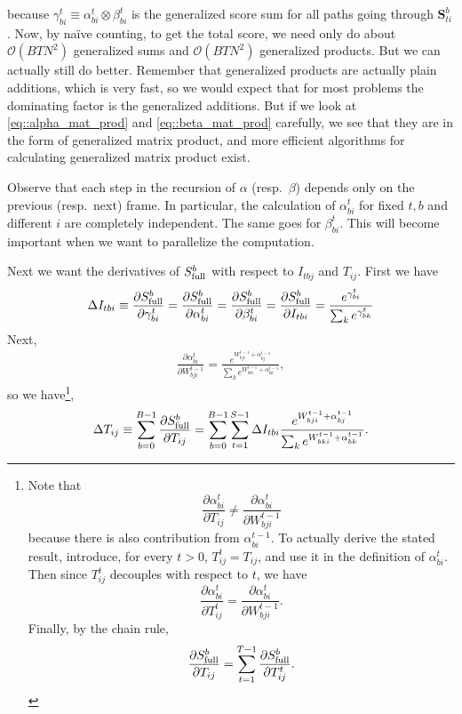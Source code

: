 \documentclass[a4paper]{article}
\begin{document}
because $\gamma^t_{bi}\equiv\alpha^t_{bi}\otimes \beta^t_{bi}$ is the generalized score sum for all paths going through $\mathbf{S}^b_{ti}$. Now, by na\"ive counting, to get the total score, we need only do about $\mathcal{O}(BTN^2)$ generalized sums and $\mathcal{O}(BTN^2)$ generalized products. But we can actually still do better. Remember that generalized products are actually plain additions, which is very fast, so we would expect that for most problems the dominating factor is the generalized additions. But if we look at \eqref{eq::alpha_mat_prod} and \eqref{eq::beta_mat_prod} carefully, we see that they are in the form of generalized matrix product, and more efficient algorithms for calculating generalized matrix product exist.

Observe that each step in the recursion of $\alpha$ (resp.~$\beta$) depends only on the previous (resp.~next) frame. In particular, the calculation of $\alpha^t_{bi}$ for fixed $t, b$ and different $i$ are completely independent. The same goes for $\beta^{t}_{bi}$. This will become important when we want to parallelize the computation.

Next we want the derivatives of $S_{\rm{full}}^b$ with respect to $I_{tbj}$ and $T_{ij}$. First we have
\begin{equation}
\Delta I_{tbi} \equiv \frac{\partial S^b_{\rm{full}}}{\partial\gamma^t_{bi}}=\frac{\partial S^b_{\rm{full}}}{\partial\alpha^t_{bi}}=\frac{\partial S^b_{\rm{full}}}{\partial\beta^t_{bi}}=\frac{\partial S^b_{\rm{full}}}{\partial I_{tbi}}=\frac{e^{\gamma^t_{bi}}}{\sum_k e^{\gamma^t_{bk}}}
\end{equation}
Next,
\begin{align}
\frac{\partial\alpha^t_{bi}}{\partial W^{t-1}_{bji}}=\frac{e^{W^{t-1}_{bji}+\alpha^{t-1}_{bj}}}{\sum_k e^{W^{t-1}_{bki}+\alpha^{t-1}_{bk}}},
\end{align}
so we have\footnote{
Note that 
\begin{equation}
\frac{\partial\alpha^t_{bi}}{\partial T_{ij}}\neq\frac{\partial\alpha^t_{bi}}{\partial W^{t-1}_{bji}}
\end{equation}
because there is also contribution from $\alpha^{t-1}_{bi}$. To actually derive the stated result, introduce, for every $t>0$, $T^t_{ij}=T_{ij}$, and use it in the definition of $\alpha^t_{bi}$. Then since $T^t_{ij}$ decouples with respect to $t$, we have
\begin{equation}
\frac{\partial\alpha^t_{bi}}{\partial T^{t}_{ij}}=\frac{\partial\alpha^t_{bi}}{\partial W^{t-1}_{bji}}.
\end{equation}
Finally, by the chain rule,
\begin{equation}
\frac{\partial S^b_{\rm{full}}}{\partial T_{ij}}=\sum_{t=1}^{T-1}\frac{\partial S^b_{\rm{full}}}{\partial T^t_{ij}}.
\end{equation}
},
\begin{equation}
\Delta T_{ij} \equiv \sum_{b=0}^{B-1}\frac{\partial S^b_{\rm{full}}}{\partial T_{ij}} = \sum_{b=0}^{B-1}\sum_{t=1}^{S-1} \Delta I_{tbi}\frac{e^{W^{t-1}_{bji}+\alpha^{t-1}_{bj}}}{\sum_k e^{W^{t-1}_{bki}+\alpha^{t-1}_{bk}}}.
\end{equation}
\end{document}
